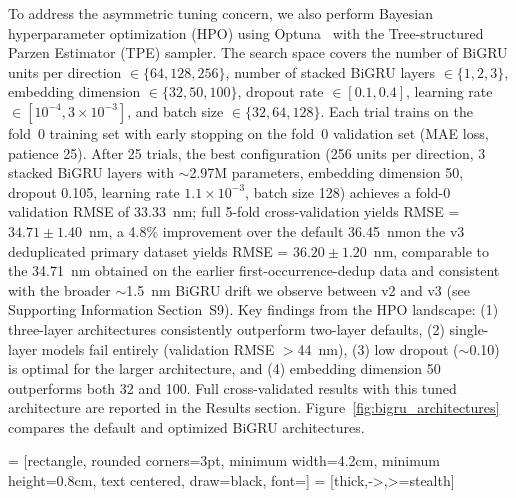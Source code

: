 \documentclass[journal=jcisd8,manuscript=article]{achemso}
\newcommand{\added}[1]{{\color{addedblue}#1}}
\newcommand{\removed}[1]{{\color{removedred}#1}}
\begin{document}
To address the asymmetric tuning concern, we also perform Bayesian hyperparameter optimization (HPO) using Optuna~\cite{akiba2019optuna} with the Tree-structured Parzen Estimator (TPE) sampler.
The search space covers the number of BiGRU units per direction $\in \{64, 128, 256\}$, number of stacked BiGRU layers $\in \{1, 2, 3\}$, embedding dimension $\in \{32, 50, 100\}$, dropout rate $\in [0.1, 0.4]$, learning rate $\in [10^{-4}, 3 \times 10^{-3}]$, and batch size $\in \{32, 64, 128\}$.
Each trial trains on the fold~0 training set with early stopping on the fold~0 validation set (MAE loss, patience 25).
After 25 trials, the best configuration (256 units per direction, 3 stacked BiGRU layers with $\sim$2.97M parameters, embedding dimension 50, dropout 0.105, learning rate $1.1 \times 10^{-3}$, batch size 128) achieves a fold-0 validation RMSE of 33.33~nm; full 5-fold cross-validation \removed{yields RMSE = $34.71 \pm 1.40$~nm, a 4.8\% improvement over the default 36.45~nm}\added{on the v3 deduplicated primary dataset yields RMSE = $36.20 \pm 1.20$~nm, comparable to the 34.71~nm obtained on the earlier first-occurrence-dedup data and consistent with the broader $\sim$1.5~nm BiGRU drift we observe between v2 and v3 (see Supporting Information Section~S9)}.
Key findings from the HPO landscape: (1) three-layer architectures consistently outperform two-layer defaults, (2) single-layer models fail entirely (validation RMSE $>$44~nm), (3) low dropout ($\sim$0.10) is optimal for the larger architecture, and (4) embedding dimension 50 outperforms both 32 and 100.
Full cross-validated results with this tuned architecture are reported in the Results section.
Figure~\ref{fig:bigru_architectures} compares the default and optimized BiGRU architectures.

 = [rectangle, rounded corners=3pt, minimum width=4.2cm, minimum height=0.8cm, text centered, draw=black, font=\small]
 = [thick,->,>=stealth]
\end{document}
